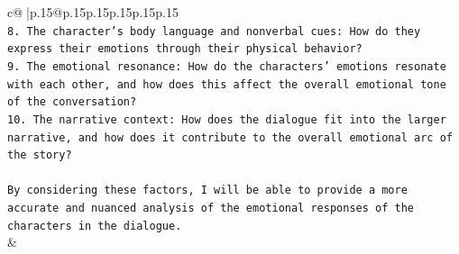 \documentclass{article}
\begin{document}
{\begin{supertabular}{c@{$\;$}|p{.15\linewidth}@{}p{.15\linewidth}p{.15\linewidth}p{.15\linewidth}p{.15\linewidth}p{.15\linewidth}}
{{{\\ 
\texttt{8. The character's body language and nonverbal cues: How do they express their emotions through their physical behavior?} \\
\texttt{9. The emotional resonance: How do the characters' emotions resonate with each other, and how does this affect the overall emotional tone of the conversation?} \\
\texttt{10. The narrative context: How does the dialogue fit into the larger narrative, and how does it contribute to the overall emotional arc of the story?} \\
\\ 
\texttt{By considering these factors, I will be able to provide a more accurate and nuanced analysis of the emotional responses of the characters in the dialogue.} \\
            }
        }
    }
    & \\ \\

\end{supertabular}
}
\end{document}
